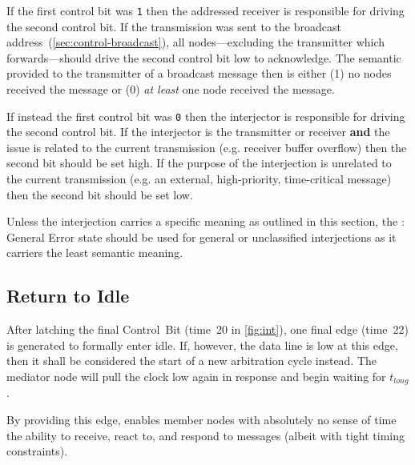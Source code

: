If the first control bit was {\tt 1} then the addressed receiver is
responsible for driving the second control bit. If the transmission was sent
to the broadcast address~(\ref{sec:control-broadcast}), all nodes---excluding
the transmitter which forwards---should drive the second control bit low to
acknowledge. The semantic provided to the transmitter of a broadcast message
then is either (1) no nodes received the message or (0) {\em at least} one
node received the message.

If instead the first control bit was {\tt 0} then the interjector is
responsible for driving the second control bit. If the interjector is the
transmitter or receiver {\bf and} the issue is related to the current
transmission (e.g. receiver buffer overflow) then the second bit should be set
high. If the purpose of the interjection is unrelated to the current
transmission (e.g. an external, high-priority, time-critical message) then the
second bit should be set low.

Unless the interjection carries a specific meaning as outlined in this
section, the {: General Error} state should be used for general or
unclassified interjections as it carriers the least semantic meaning.

\subsection{Return to Idle}
\label{sec:protocol-return-idle}
After latching the final Control~Bit (time~20 in \cref{fig:int}), one final
edge (time~22) is generated to formally enter {\sc idle}. If, however, the
data line is low at this edge, then it shall be considered the start of a new
arbitration cycle instead. The mediator node will pull the clock low again in
response and begin waiting for $t_{long}$.

By providing this edge, \bus enables member nodes with absolutely no sense of
time the ability to receive, react to, and respond to messages (albeit with
tight timing constraints).
